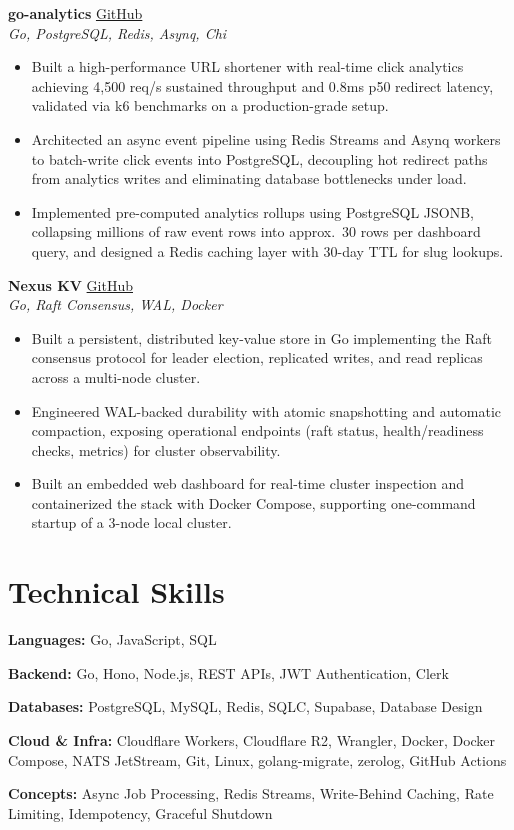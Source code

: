 \documentclass[11pt]{article}
\begin{document}
\textbf{go-analytics} \hfill \href{https://github.com/mnah05/go-analytics}{GitHub}\\
\textit{Go, PostgreSQL, Redis, Asynq, Chi}
\begin{itemize}[nosep, leftmargin=1.5em]
  \item Built a high-performance URL shortener with real-time click analytics achieving 4,500 req/s sustained throughput and 0.8ms p50 redirect latency, validated via k6 benchmarks on a production-grade setup.
  \item Architected an async event pipeline using Redis Streams and Asynq workers to batch-write click events into PostgreSQL, decoupling hot redirect paths from analytics writes and eliminating database bottlenecks under load.
  \item Implemented pre-computed analytics rollups using PostgreSQL JSONB, collapsing millions of raw event rows into approx.\ 30 rows per dashboard query, and designed a Redis caching layer with 30-day TTL for slug lookups.
\end{itemize}

\vspace{0.35em}

\textbf{Nexus KV} \hfill \href{https://github.com/mnah05/nexus}{GitHub}\\
\textit{Go, Raft Consensus, WAL, Docker}
\begin{itemize}[nosep, leftmargin=1.5em]
  \item Built a persistent, distributed key-value store in Go implementing the Raft consensus protocol for leader election, replicated writes, and read replicas across a multi-node cluster.
  \item Engineered WAL-backed durability with atomic snapshotting and automatic compaction, exposing operational endpoints (raft status, health/readiness checks, metrics) for cluster observability.
  \item Built an embedded web dashboard for real-time cluster inspection and containerized the stack with Docker Compose, supporting one-command startup of a 3-node local cluster.
\end{itemize}

\section{Technical Skills}

\textbf{Languages:} Go, JavaScript, SQL

\textbf{Backend:} Go, Hono, Node.js, REST APIs, JWT Authentication, Clerk

\textbf{Databases:} PostgreSQL, MySQL, Redis, SQLC, Supabase, Database Design

\textbf{Cloud \& Infra:} Cloudflare Workers, Cloudflare R2, Wrangler, Docker, Docker Compose, NATS JetStream, Git, Linux, golang-migrate, zerolog, GitHub Actions

\textbf{Concepts:} Async Job Processing, Redis Streams, Write-Behind Caching, Rate Limiting, Idempotency, Graceful Shutdown
\end{document}
